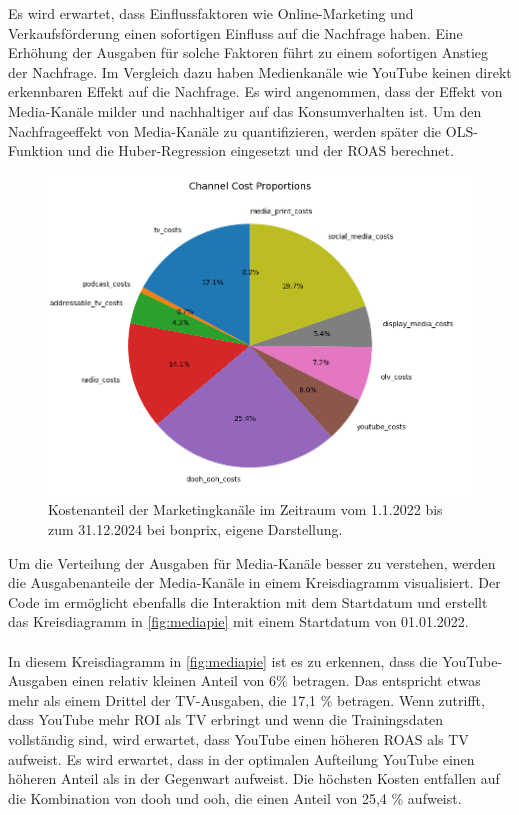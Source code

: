 \noindent
Es wird erwartet, dass Einflussfaktoren wie Online-Marketing und Verkaufsförderung einen sofortigen Einfluss auf die Nachfrage haben. Eine Erhöhung der Ausgaben für solche Faktoren führt zu einem sofortigen Anstieg der Nachfrage. Im Vergleich dazu haben Medienkanäle wie YouTube keinen direkt erkennbaren Effekt auf die Nachfrage. Es wird angenommen, dass der Effekt von Media-Kanäle milder und nachhaltiger auf das Konsumverhalten ist. Um den Nachfrageeffekt von Media-Kanäle zu quantifizieren, werden später die \ac{OLS}-Funktion und die Huber-Regression eingesetzt und der \ac{ROAS} berechnet.
\begin{figure}[H]
    \centering
    \includegraphics[width=0.8\linewidth]{images/mediapie.png}
    \caption{Kostenanteil der Marketingkanäle im Zeitraum vom 1.1.2022 bis zum 31.12.2024 bei bonprix, eigene Darstellung.}
    \label{fig:mediapie}
\end{figure}
\noindent
Um die Verteilung der Ausgaben für Media-Kanäle besser zu verstehen, werden die Ausgabenanteile der Media-Kanäle in einem Kreisdiagramm visualisiert. Der Code im  ermöglicht ebenfalls die Interaktion mit dem Startdatum und erstellt das Kreisdiagramm in \autoref{fig:mediapie} mit einem Startdatum von 01.01.2022.\\\\
In diesem Kreisdiagramm in \autoref{fig:mediapie} ist es zu erkennen, dass die YouTube-Ausgaben einen relativ kleinen Anteil von 6\% betragen. Das entspricht etwas mehr als einem Drittel der TV-Ausgaben, die 17,1 \% betragen. Wenn  zutrifft, dass YouTube mehr \ac{ROI} als TV erbringt und wenn die Trainingsdaten vollständig sind, wird erwartet, dass YouTube einen höheren \ac{ROAS} als TV aufweist. Es wird erwartet, dass in der optimalen Aufteilung YouTube einen höheren Anteil als in der Gegenwart aufweist. Die höchsten Kosten entfallen auf die Kombination von \ac{dooh} und \ac{ooh}, die einen Anteil von 25,4 \% aufweist.
\newpage
